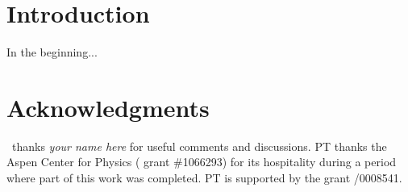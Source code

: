 \documentclass[12pt]{article}
\begin{document}
\small
\setcounter{tocdepth}{2}
\tableofcontents
\normalsize



\section{Introduction}

In the beginning... \lipsum[5]





 \section*{Acknowledgments}


\ thanks 
\emph{your name here}
for useful comments and discussions. 
%
\textsc{PT} thanks the Aspen Center for Physics ( grant \#1066293) for its hospitality during a period where part of this work was completed. \textsc{PT} is supported by the  grant /0008541.



% 
\end{document}
